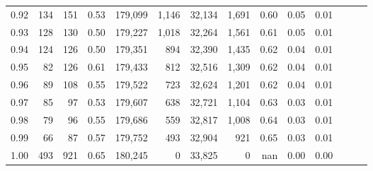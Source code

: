 \begin{tabular}{rrrrrrrrrrrrrr}
0.92 &    134 &  151 &  0.53 &  179,099 &    1,146 &  32,134 &   1,691 &  0.60 &  0.05 &      0.01 \\
0.93 &    128 &  130 &  0.50 &  179,227 &    1,018 &  32,264 &   1,561 &  0.61 &  0.05 &      0.01 \\
0.94 &    124 &  126 &  0.50 &  179,351 &      894 &  32,390 &   1,435 &  0.62 &  0.04 &      0.01 \\
0.95 &     82 &  126 &  0.61 &  179,433 &      812 &  32,516 &   1,309 &  0.62 &  0.04 &      0.01 \\
0.96 &     89 &  108 &  0.55 &  179,522 &      723 &  32,624 &   1,201 &  0.62 &  0.04 &      0.01 \\
0.97 &     85 &   97 &  0.53 &  179,607 &      638 &  32,721 &   1,104 &  0.63 &  0.03 &      0.01 \\
0.98 &     79 &   96 &  0.55 &  179,686 &      559 &  32,817 &   1,008 &  0.64 &  0.03 &      0.01 \\
0.99 &     66 &   87 &  0.57 &  179,752 &      493 &  32,904 &     921 &  0.65 &  0.03 &      0.01 \\
1.00 &    493 &  921 &  0.65 &  180,245 &        0 &  33,825 &       0 &   nan &  0.00 &      0.00 \\
\bottomrule
\end{tabular}
